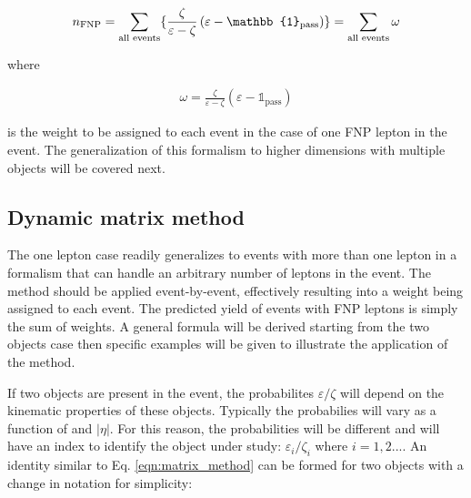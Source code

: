 \[
n_\text{FNP} = \sum_\text{all events} \{
\frac{\zeta}{\varepsilon - \zeta}\left(\varepsilon - 
\mathbb{1}_\text{pass}\right)
\}
\\
=  \sum_\text{all events} \omega
\]

where 

\begin{align}
  \omega = \frac{\zeta}{\varepsilon - \zeta}\left(\varepsilon - 
\mathbb{1}_\text{pass}\right)
  \label{eqn:fake.nFNPpass.demo}
\end{align}

is the weight to be assigned to each event in the case of one FNP lepton 
in the event. 
The generalization of this formalism to higher dimensions 
with multiple objects will be covered next.



\subsection{Dynamic matrix method}


The one lepton case readily generalizes to events with more than one lepton
in a formalism that can handle an arbitrary number of leptons 
in the event. The method should be applied event-by-event, effectively 
resulting into a weight being assigned to each event. The predicted yield of 
events with FNP leptons is simply the sum of weights.
A general formula will be derived starting from the two objects case 
then specific examples will be given to illustrate the application of the 
method.

If two objects are present in the event, the probabilites $\varepsilon/\zeta$
will depend on the kinematic properties of these objects. Typically 
the probabilies will vary as a function of \pt and $|\eta|$. For this reason,
the probabilities will be different and will have an index to 
identify the object under study: 
 $\varepsilon_i/\zeta_i$ where $i=1,2...$. 
An identity similar to Eq.  \ref{eqn:matrix_method} can be formed for 
two objects with a change in notation for simplicity:

